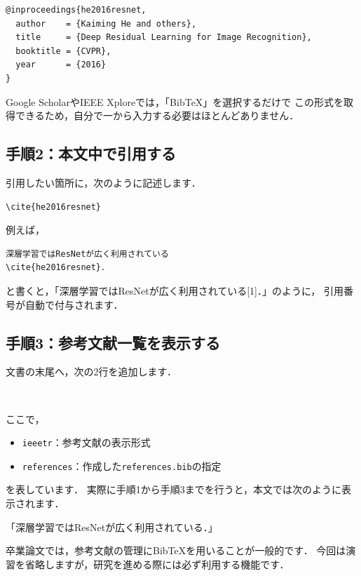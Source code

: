 \documentclass[a4paper,twocolumn]{jsarticle}
\begin{document}
\begin{lstlisting}[language={}]
@inproceedings{he2016resnet,
  author    = {Kaiming He and others},
  title     = {Deep Residual Learning for Image Recognition},
  booktitle = {CVPR},
  year      = {2016}
}
\end{lstlisting}

Google ScholarやIEEE Xploreでは，「BibTeX」を選択するだけで
この形式を取得できるため，自分で一から入力する必要はほとんどありません．

\subsection*{手順2：本文中で引用する}
引用したい箇所に，次のように記述します．

\begin{verbatim}
\cite{he2016resnet}
\end{verbatim}

例えば，

\begin{verbatim}
深層学習ではResNetが広く利用されている
\cite{he2016resnet}．
\end{verbatim}

と書くと，「深層学習ではResNetが広く利用されている[1]．」のように，
引用番号が自動で付与されます．

\subsection*{手順3：参考文献一覧を表示する}
文書の末尾へ，次の2行を追加します．

\begin{verbatim}


\end{verbatim}

ここで，

\begin{itemize}
    \item \texttt{ieeetr}：参考文献の表示形式
    \item \texttt{references}：作成した\texttt{references.bib}の指定
\end{itemize}

を表しています．
実際に手順1から手順3までを行うと，本文では次のように表示されます．

「深層学習ではResNetが広く利用されている\cite{he2016resnet}．」

卒業論文では，参考文献の管理にBibTeXを用いることが一般的です．
今回は演習を省略しますが，研究を進める際には必ず利用する機能です．
\end{document}
